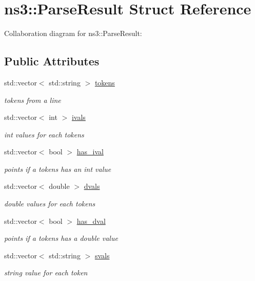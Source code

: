 \hypertarget{structns3_1_1ParseResult}{}\section{ns3\+:\+:Parse\+Result Struct Reference}
\label{structns3_1_1ParseResult}


Collaboration diagram for ns3\+:\+:Parse\+Result\+:
\subsection*{Public Attributes}
\begin{DoxyCompactItemize}
\item 
std\+::vector$<$ std\+::string $>$ \hyperlink{structns3_1_1ParseResult_a5b229ec9d2b9721f7bab7186b2701f0d}{tokens}
\begin{DoxyCompactList}\small\item\em tokens from a line \end{DoxyCompactList}\item 
std\+::vector$<$ int $>$ \hyperlink{structns3_1_1ParseResult_a91584286bc7cb7bb4b0084090228d341}{ivals}
\begin{DoxyCompactList}\small\item\em int values for each tokens \end{DoxyCompactList}\item 
std\+::vector$<$ bool $>$ \hyperlink{structns3_1_1ParseResult_ac0f1c980518c55a84a8dbf4c016666f5}{has\+\_\+ival}
\begin{DoxyCompactList}\small\item\em points if a tokens has an int value \end{DoxyCompactList}\item 
std\+::vector$<$ double $>$ \hyperlink{structns3_1_1ParseResult_a0b4fe77a1ffa89ee2fe02c42dc1c6dba}{dvals}
\begin{DoxyCompactList}\small\item\em double values for each tokens \end{DoxyCompactList}\item 
std\+::vector$<$ bool $>$ \hyperlink{structns3_1_1ParseResult_ac9d008ac8c44f45e6b2fbd4b22c7df00}{has\+\_\+dval}
\begin{DoxyCompactList}\small\item\em points if a tokens has a double value \end{DoxyCompactList}\item 
std\+::vector$<$ std\+::string $>$ \hyperlink{structns3_1_1ParseResult_a5b09d2266fc867d306029482ef583d17}{svals}
\begin{DoxyCompactList}\small\item\em string value for each token \end{DoxyCompactList}\end{DoxyCompactItemize}


